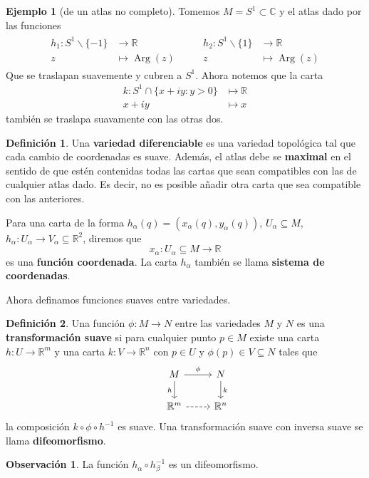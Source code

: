 \documentclass[spanish]{book}
\theoremstyle{definition}
\newtheorem*{defn}{Definición}
\newtheorem*{obs}{Observación}
\newtheorem*{ejem}{Ejemplo}
\newcommand{\R}{\mathbb{R}}
\newcommand{\C}{\mathbb{C}}
\DeclareMathOperator{\Arg}{Arg}
\begin{document}
\begin{ejem}[de un atlas no completo]
	Tomemos $M=S^1\subset\C$ y el atlas dado por las funciones
	\begin{align*}
		\begin{aligned}
			h_1:S^1\backslash\{-1\}&\to\R\\
			z&\mapsto\Arg(z)
		\end{aligned}
		\qquad
		\begin{aligned}
			h_2:S^1\backslash\{1\}&\to\R\\
			z&\mapsto\Arg(z)
		\end{aligned}
	\end{align*}
	Que se traslapan suavemente y cubren a $S^1$. Ahora notemos que la carta
	\begin{align*}
		k:S^1\cap\{x+iy:y>0\}&\mapsto\R\\
		x+iy&\mapsto x
	\end{align*}
	también se traslapa suavamente con las otras dos.
\end{ejem}
\begin{defn}
	Una \textbf{variedad diferenciable} es una variedad topológica tal que cada cambio de coordenadas es suave. Además, el atlas debe se \textbf{maximal} en el sentido de que estén contenidas todas las cartas que sean compatibles con las de cualquier atlas dado. Es decir, no es posible añadir otra carta que sea compatible con las anteriores.
	
	Para una carta de la forma $h_\alpha(q)=(x_\alpha(q),y_\alpha(q))$, $U_\alpha\subseteq M$, $h_\alpha:U_\alpha\to V_\alpha\subseteq\R^2$, diremos que 
	\[x_\alpha:U_\alpha\subseteq M\to \R\]
	es una \textbf{función coordenada}. La carta $h_\alpha$ también se llama \textbf{sistema de coordenadas}.
\end{defn}
Ahora definamos funciones suaves entre variedades.
\begin{defn}
	Una función $\phi:M\to N$ entre las variedades $M$ y $N$ es una \textbf{transformación suave} si para cualquier punto $p\in M$ existe una carta $h:U\to \R^m$ y una carta $k:V\to\R^n$ con $p\in U$ y $\phi(p)\in V\subseteq N$ tales que 
	\[\begin{tikzcd}
		&M\arrow{r}{\phi}\arrow[swap]{d}{h}&N\arrow{d}{k}\\
		&\R^m\arrow[dashed]{r}&\R^n
	\end{tikzcd}\]
	la composición $k\circ\phi \circ h^{-1}$ es suave. Una transformación suave con inversa suave se llama \textbf{difeomorfismo}.
\end{defn}
\begin{obs}
	La función $h_\alpha\circ h_\beta^{-1}$ es un difeomorfismo.
\end{obs}
\end{document}
